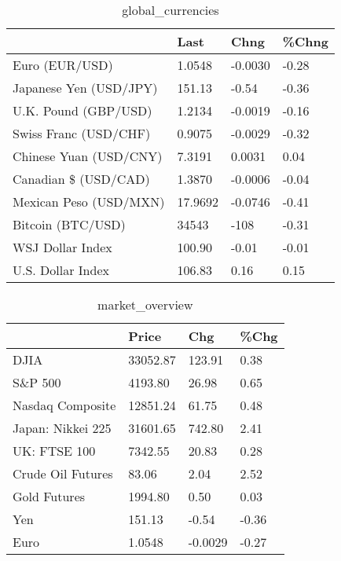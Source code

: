 \documentclass{article}%
\begin{document}
%


\begin{table}[htbp]%
\caption{global\_currencies}%
\centering%
\begin{adjustbox}{width=1\textwidth}%
\begin{tabular}{llll}
\toprule
                       &    Last &    Chng & \%Chng \\
\midrule
        Euro (EUR/USD) &  1.0548 & -0.0030 & -0.28 \\
Japanese Yen (USD/JPY) &  151.13 &   -0.54 & -0.36 \\
  U.K. Pound (GBP/USD) &  1.2134 & -0.0019 & -0.16 \\
 Swiss Franc (USD/CHF) &  0.9075 & -0.0029 & -0.32 \\
Chinese Yuan (USD/CNY) &  7.3191 &  0.0031 &  0.04 \\
  Canadian \$ (USD/CAD) &  1.3870 & -0.0006 & -0.04 \\
Mexican Peso (USD/MXN) & 17.9692 & -0.0746 & -0.41 \\
     Bitcoin (BTC/USD) &   34543 &    -108 & -0.31 \\
      WSJ Dollar Index &  100.90 &   -0.01 & -0.01 \\
     U.S. Dollar Index &  106.83 &    0.16 &  0.15 \\
\bottomrule
\end{tabular}
%
\end{adjustbox}%
\end{table}

%


\begin{table}[htbp]%
\caption{market\_overview}%
\centering%
\begin{adjustbox}{width=1\textwidth}%
\begin{tabular}{llll}
\toprule
                  &    Price &     Chg &  \%Chg \\
\midrule
             DJIA & 33052.87 &  123.91 &  0.38 \\
          S\&P 500 &  4193.80 &   26.98 &  0.65 \\
 Nasdaq Composite & 12851.24 &   61.75 &  0.48 \\
Japan: Nikkei 225 & 31601.65 &  742.80 &  2.41 \\
     UK: FTSE 100 &  7342.55 &   20.83 &  0.28 \\
Crude Oil Futures &    83.06 &    2.04 &  2.52 \\
     Gold Futures &  1994.80 &    0.50 &  0.03 \\
              Yen &   151.13 &   -0.54 & -0.36 \\
             Euro &   1.0548 & -0.0029 & -0.27 \\
\bottomrule
\end{tabular}
%
\end{adjustbox}%
\end{table}

%
\end{document}
